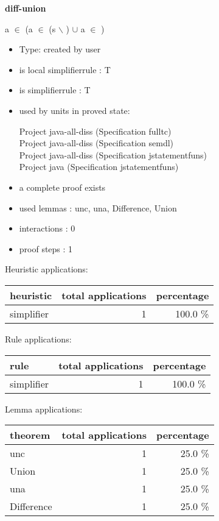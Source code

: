 \documentclass[a4paper]{article}
\begin{document}
{\LARGE\bf diff-union}\label{lemma-diff-union}

\medskip

 \Fol a $\in$  \Imp (a $\in$ (s $\backslash$ ) $\cup$  \Equiv a $\in$ )

\begin{itemize}

\item Type: created by user

\item is local simplifierrule : T
\item is simplifierrule : T
\item used by units in proved state:

Project java-all-diss (Specification fulltc) \\
Project java-all-diss (Specification semdl) \\
Project java-all-diss (Specification jstatementfuns) \\
Project java (Specification jstatementfuns)
\item       a complete proof exists
\item       used lemmas  : unc, una, Difference, Union
\item       interactions : 0
\item       proof steps  : 1
\end{itemize}

\medskip


Heuristic applications:

\begin{supertabular}{l|r|r}
heuristic	& total applications & percentage \\ \hline
simplifier & 1 & 100.0 \% \\

\end{supertabular}

Rule applications:

\begin{supertabular}{l|r|r}
rule	        & total applications & percentage \\ \hline
simplifier & 1 & 100.0 \% \\

\end{supertabular}

Lemma applications:

\begin{supertabular}{l|r|r}
theorem	        & total applications & percentage \\ \hline
unc & 1 & 25.0 \% \\
Union & 1 & 25.0 \% \\
una & 1 & 25.0 \% \\
Difference & 1 & 25.0 \% \\

\end{supertabular}
\pagebreak
\end{document}
